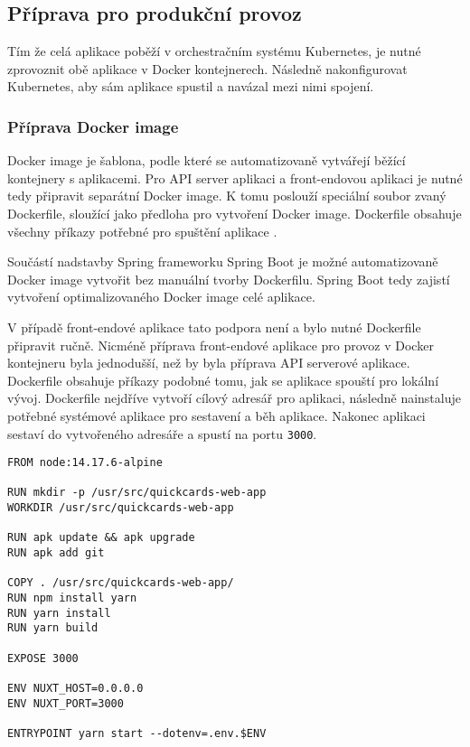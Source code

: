 	\subsection{Příprava pro produkční provoz}

	Tím že celá aplikace poběží v orchestračním systému Kubernetes, je nutné zprovoznit obě aplikace v Docker kontejnerech.
	Následně nakonfigurovat Kubernetes, aby sám aplikace spustil a navázal mezi nimi spojení.

		\subsubsection{Příprava Docker image}

		Docker image je šablona, podle které se automatizovaně vytvářejí běžící kontejnery s aplikacemi.
		Pro \ac{API} server aplikaci a front-endovou aplikaci je nutné tedy připravit separátní Docker image.
		K tomu poslouží speciální soubor zvaný Dockerfile, sloužící jako předloha pro vytvoření Docker image.
		Dockerfile obsahuje všechny příkazy potřebné pro spuštění aplikace \cite{dockerfile_reference}.

		Součástí nadstavby Spring frameworku Spring Boot je možné automatizovaně Docker image vytvořit bez manuální tvorby
		Dockerfilu.
		Spring Boot tedy zajistí vytvoření optimalizovaného Docker image celé aplikace.

		V případě front-endové aplikace tato podpora není a bylo nutné Dockerfile připravit ručně.
		Nicméně příprava front-endové aplikace pro provoz v Docker kontejneru byla jednodušší, než by byla příprava \ac{API}
		serverové aplikace.
		Dockerfile obsahuje příkazy podobné tomu, jak se aplikace spouští pro lokální vývoj.
		Dockerfile nejdříve vytvoří cílový adresář pro aplikaci, následně nainstaluje potřebné systémové aplikace pro sestavení
		a běh aplikace.
		Nakonec aplikaci sestaví do vytvořeného adresáře a spustí na portu \lstinline{3000}.

		\begin{codeblock}
			\begin{verbatim}
FROM node:14.17.6-alpine

RUN mkdir -p /usr/src/quickcards-web-app
WORKDIR /usr/src/quickcards-web-app

RUN apk update && apk upgrade
RUN apk add git

COPY . /usr/src/quickcards-web-app/
RUN npm install yarn
RUN yarn install
RUN yarn build

EXPOSE 3000

ENV NUXT_HOST=0.0.0.0
ENV NUXT_PORT=3000

ENTRYPOINT yarn start --dotenv=.env.$ENV
			\end{verbatim}
		\end{codeblock}

